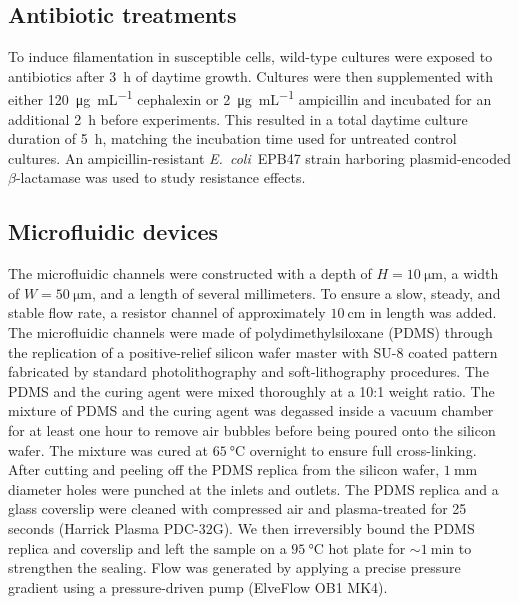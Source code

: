 \documentclass[twoside,twocolumn,9pt]{article}
\newcommand{\ecoli}{{\it E.~coli}}
\begin{document}
    \subsection*{Antibiotic treatments}
    
    To induce filamentation in susceptible cells, wild-type cultures were exposed to antibiotics after \SI{3}{\hour} of daytime growth. Cultures were then supplemented with either \SI{120}{\micro\gram\per\milli\liter} cephalexin or \SI{2}{\micro\gram\per\milli\liter} ampicillin and incubated for an additional \SI{2}{\hour} before experiments. This resulted in a total daytime culture duration of \SI{5}{\hour}, matching the incubation time used for untreated control cultures. An ampicillin-resistant \ecoli\ EPB47 strain harboring plasmid-encoded $\beta$-lactamase was used to study resistance effects.
    
    \subsection*{Microfluidic devices}
    
    The microfluidic channels were constructed with a depth of $H = \SI{10}{\micro\meter}$, a width of $W=\SI{50}{\micro\meter}$, and a length of several millimeters. To ensure a slow, steady, and stable flow rate, a resistor channel of approximately $\SI{10}{\centi\meter}$ in length was added. 
    The microfluidic channels were made of polydimethylsiloxane (PDMS) through the replication of a positive-relief silicon wafer master with SU-8 coated pattern fabricated by standard photolithography and soft-lithography procedures. The PDMS and the curing agent were mixed thoroughly at a 10:1 weight ratio. The mixture of PDMS and the curing agent was degassed inside a vacuum chamber for at least one hour to remove air bubbles before being poured onto the silicon wafer. The mixture was cured at $\SI{65}{\celsius}$ overnight to ensure full cross-linking. After cutting and peeling off the PDMS replica from the silicon wafer, $\SI{1}{\milli\meter}$ diameter holes were punched at the inlets and outlets. The PDMS replica and a glass coverslip were cleaned with compressed air and plasma-treated for 25 seconds (Harrick Plasma PDC-32G). We then irreversibly bound the PDMS replica and coverslip and left the sample on a $\SI{95}{\celsius}$ hot plate for $\sim \SI{1}{\minute}$ to strengthen the sealing. Flow was generated by applying a precise pressure gradient using a pressure-driven pump (ElveFlow OB1 MK4). 
    
\end{document}
